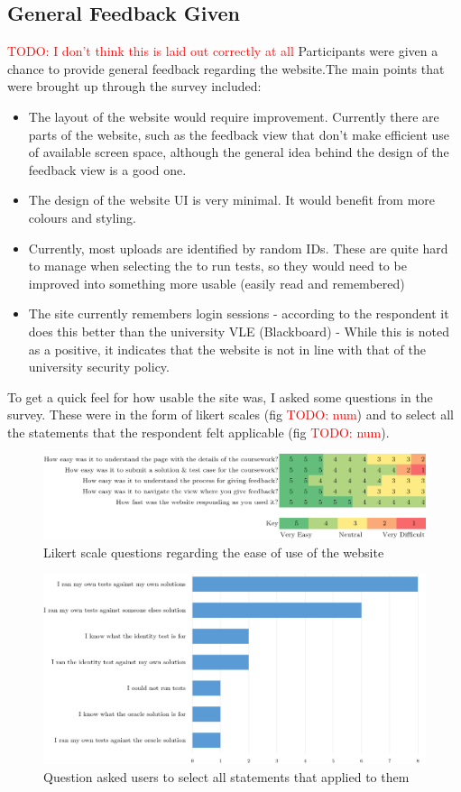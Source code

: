 \documentclass[a4paper,11pt]{report}
\newcommand{\todo}[1]{\textcolor{red}{TODO: #1}}
\begin{document}
\subsection{General Feedback Given}
\todo{I don't think this is laid out correctly at all}
Participants were given a chance to provide general feedback regarding the website.The main points that were brought up through the survey included:
\begin{itemize}
\item The layout of the website would require improvement. Currently there are parts of the website, such as the feedback view that don't make efficient use of available screen space, although the general idea behind the design of the feedback view is a good one.
\item The design of the website UI is very minimal. It would benefit from more colours and styling.
\item Currently, most uploads are identified by random IDs. These are quite hard to manage when selecting the to run tests, so they would need to be improved into something more usable (easily read and remembered)
\item The site currently remembers login sessions - according to the respondent it does this better than the university VLE (Blackboard) - While this is noted as a positive, it indicates that the website is not in line with that of the university security policy.
\end{itemize}
To get a quick feel for how usable the site was, I asked some questions in the survey. These were in the form of likert scales (fig \todo{num}) and to select all the statements that the respondent felt applicable (fig \todo{num}).
\begin{figure}[ht]
\includegraphics[width=\textwidth]{eva-result/likert-site-usable.png}
\caption{Likert scale questions regarding the ease of use of the website}
\end{figure}
\begin{figure}[ht]
\includegraphics[width=\textwidth]{eva-result/stmt-tests.png}
\caption{Question asked users to select all statements that applied to them}
\end{figure}
\end{document}
